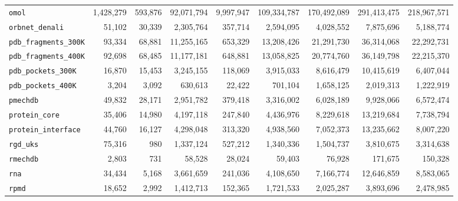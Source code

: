 \begin{scriptsize}
\begin{longtable}{lrrrrrrrr}
\texttt{omol}                    &  1{,}428{,}279 &    593{,}876 &  92{,}071{,}794 &   9{,}997{,}947 & 109{,}334{,}787 &  170{,}492{,}089 &  291{,}413{,}475 &  218{,}967{,}571 \\
\texttt{orbnet\_denali}           &     51{,}102 &     30{,}339 &   2{,}305{,}764 &     357{,}714 &   2{,}594{,}095 &    4{,}028{,}552 &    7{,}875{,}696 &    5{,}188{,}774 \\
\texttt{pdb\_fragments\_300K}      &     93{,}334 &     68{,}881 &  11{,}255{,}165 &     653{,}329 &  13{,}208{,}426 &   21{,}291{,}730 &   36{,}314{,}068 &   22{,}292{,}731 \\
\texttt{pdb\_fragments\_400K}      &     92{,}698 &     68{,}485 &  11{,}177{,}181 &     648{,}881 &  13{,}058{,}825 &   20{,}774{,}760 &   36{,}149{,}798 &   22{,}215{,}370 \\
\texttt{pdb\_pockets\_300K}        &     16{,}870 &     15{,}453 &   3{,}245{,}155 &     118{,}069 &   3{,}915{,}033 &    8{,}616{,}479 &   10{,}415{,}619 &    6{,}407{,}044 \\
\texttt{pdb\_pockets\_400K}        &      3{,}204 &      3{,}092 &     630{,}613 &      22{,}422 &     701{,}104 &    1{,}658{,}125 &    2{,}019{,}313 &    1{,}222{,}919 \\
\texttt{pmechdb}                 &     49{,}832 &     28{,}171 &   2{,}951{,}782 &     379{,}418 &   3{,}316{,}002 &    6{,}028{,}189 &    9{,}928{,}066 &    6{,}572{,}474 \\
\texttt{protein\_core}            &     35{,}406 &     14{,}980 &   4{,}197{,}118 &     247{,}840 &   4{,}436{,}976 &    8{,}229{,}618 &   13{,}219{,}684 &    7{,}738{,}794 \\
\texttt{protein\_interface}       &     44{,}760 &     16{,}127 &   4{,}298{,}048 &     313{,}320 &   4{,}938{,}560 &    7{,}052{,}373 &   13{,}235{,}662 &    8{,}007{,}220 \\
\texttt{rgd\_uks}                 &     75{,}316 &        980 &   1{,}337{,}124 &     527{,}212 &   1{,}340{,}336 &    1{,}504{,}737 &    3{,}810{,}675 &    3{,}314{,}638 \\
\texttt{rmechdb}                 &      2{,}803 &        731 &      58{,}528 &      28{,}024 &      59{,}403 &       76{,}928 &      171{,}675 &      150{,}328 \\
\texttt{rna}                     &     34{,}434 &      5{,}168 &   3{,}661{,}659 &     241{,}036 &   4{,}108{,}650 &    7{,}166{,}774 &   12{,}646{,}859 &    8{,}583{,}065 \\
\texttt{rpmd}                    &     18{,}652 &      2{,}992 &   1{,}412{,}713 &     152{,}365 &   1{,}721{,}533 &    2{,}025{,}287 &    3{,}893{,}696 &    2{,}478{,}985 \\

\end{longtable}
\end{scriptsize}
